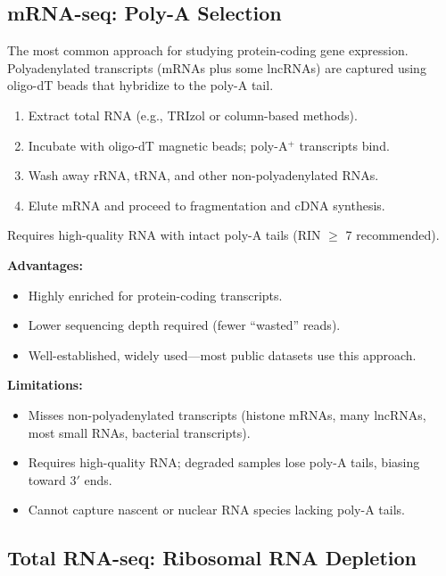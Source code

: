 \subsection{mRNA-seq: Poly-A Selection}

The most common approach for studying protein-coding gene expression.
Polyadenylated transcripts (mRNAs plus some lncRNAs) are captured using
oligo-dT beads that hybridize to the poly-A tail.

\begin{protocolbox}[title={Poly-A Selection Protocol Overview}]
\begin{enumerate}[nosep]
  \item Extract total RNA (e.g., TRIzol or column-based methods).
  \item Incubate with oligo-dT magnetic beads; poly-A$^+$ transcripts bind.
  \item Wash away rRNA, tRNA, and other non-polyadenylated RNAs.
  \item Elute mRNA and proceed to fragmentation and cDNA synthesis.
\end{enumerate}
Requires high-quality RNA with intact poly-A tails (RIN $\geq$ 7 recommended).
\end{protocolbox}

\textbf{Advantages:}
\begin{itemize}[nosep]
  \item Highly enriched for protein-coding transcripts.
  \item Lower sequencing depth required (fewer ``wasted'' reads).
  \item Well-established, widely used---most public datasets use this approach.
\end{itemize}

\textbf{Limitations:}
\begin{itemize}[nosep]
  \item Misses non-polyadenylated transcripts (histone mRNAs, many lncRNAs, most
    small RNAs, bacterial transcripts).
  \item Requires high-quality RNA; degraded samples lose poly-A tails, biasing
    toward 3$'$ ends.
  \item Cannot capture nascent or nuclear RNA species lacking poly-A tails.
\end{itemize}

\subsection{Total RNA-seq: Ribosomal RNA Depletion}


